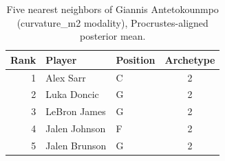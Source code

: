 \begin{table}[htbp]
  \centering\small
  \begin{tabular}{rllc}
    \toprule
    Rank & Player & Position & Archetype \\
    \midrule
    1 & Alex Sarr & C & 2 \\
    2 & Luka Doncic & G & 2 \\
    3 & LeBron James & G & 2 \\
    4 & Jalen Johnson & F & 2 \\
    5 & Jalen Brunson & G & 2 \\
    \bottomrule
  \end{tabular}
  \caption{Five nearest neighbors of Giannis Antetokounmpo (curvature_m2 modality), Procrustes-aligned posterior mean.}
  \label{tab:Giannis_Antetokounmpo_neighbors_curvature_m2}
\end{table}

